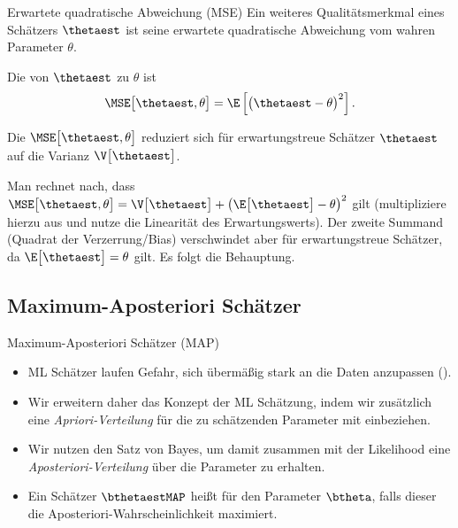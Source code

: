 \begin{frame}{Erwartete quadratische Abweichung (MSE)}{}
	Ein weiteres Qualitätsmerkmal eines Schätzers $\thetaest$ ist seine erwartete quadratische
	Abweichung vom wahren Parameter $\theta$.
	
	\begin{mydef}
		Die  von $\thetaest$ zu $\theta$ ist
		\begin{equation*}
			\MSE\bigl[ \thetaest, \theta \bigr] = \E\left[ \bigl( \thetaest - \theta \bigr)^2 \right].
		\end{equation*}
	\end{mydef}
	
	Die $\MSE\bigl[ \thetaest, \theta \bigr]$ reduziert sich für erwartungstreue Schätzer $\thetaest$
	auf die Varianz $\V\bigl[ \thetaest \bigr]$. \\
	\vspace*{2mm}
	\begin{myproof}
		Man rechnet nach, dass
		$\MSE\bigl[ \thetaest, \theta \bigr] = \V\bigl[ \thetaest \bigr] + \bigl( \E\bigl[ \thetaest \bigr] - \theta \bigr)^2$ gilt
		(multipliziere hierzu aus und nutze die Linearität des Erwartungswerts).
		Der zweite Summand (Quadrat der Verzerrung/Bias) verschwindet aber für erwartungstreue Schätzer,
		da $\E\bigl[ \thetaest \bigr] = \theta$ gilt. Es folgt die Behauptung.
	\end{myproof}
\end{frame}


\subsection{Maximum-Aposteriori Schätzer}

\begin{frame}{Maximum-Aposteriori Schätzer (MAP)}{}
	\begin{itemize}
		\item ML Schätzer laufen Gefahr, sich übermäßig stark an die Daten anzupassen ().
		\item Wir erweitern daher das Konzept der ML Schätzung, indem wir zusätzlich eine \textit{Apriori-Verteilung}
			für die zu schätzenden Parameter mit einbeziehen.
		\item Wir nutzen den Satz von Bayes, um damit zusammen mit der Likelihood eine \textit{Aposteriori-Verteilung}
			über die Parameter zu erhalten.
		\item Ein Schätzer $\bthetaestMAP$ heißt  für den Parameter $\btheta$,
			falls dieser die Aposteriori-Wahrscheinlichkeit maximiert.
	\end{itemize}
\end{frame}


